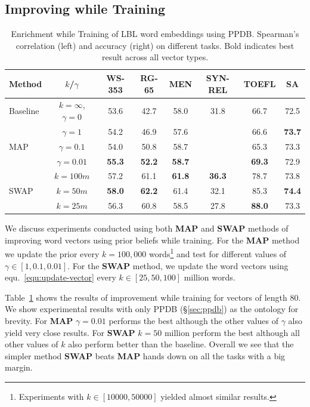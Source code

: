 \documentclass[11pt]{article}
\begin{document}
\subsection{Improving while Training}
\label{sec:improve-tr}

\begin{table}[!tbh]
  \centering
  \small
  \begin{tabular}{l|c||c|c|c||c|c||c}
Method & $k$/$\gamma$ & WS-353 & RG-65 & MEN & SYN-REL & TOEFL & SA \\
\hline
Baseline & $k=\infty$, $\gamma=0$ & 53.6 & 42.7 & 58.0 & 31.8 & 66.7 & 72.5 \\
\hline
\multirow{3}{*}{MAP} & $\gamma=1$ & 54.2 & 46.9 & 57.6 & & 66.6 & \textbf{73.7}\\
 & $\gamma=0.1$ & 54.0 & 50.8 & 58.7 & & 65.3 & 73.3\\
 & $\gamma=0.01$ & \textbf{55.3} & \textbf{52.2} & \textbf{58.7} & & \textbf{69.3} & 72.9\\
\hline\hline
\multirow{3}{*}{SWAP} & $k=100m$ & 57.2 & 61.1 & \textbf{61.8} & \textbf{36.3} & 78.7 & 73.8\\
 & $k=50m$ & \textbf{58.0} & \textbf{62.2} & 61.4 & 32.1 & 85.3 & \textbf{74.4} \\
 & $k=25m$ & 56.3 & 60.8 & 58.5 & 27.8 & \textbf{88.0} & 73.3\\
\end{tabular}
   \caption{Enrichment while Training of LBL word embeddings using PPDB.
   Spearman's correlation (left) and accuracy (right) on different tasks. Bold indicates 
   best result across all vector types.}
  \label{tab:lbl-tr}
\end{table}

We discuss experiments conducted using both \textbf{MAP} and \textbf{SWAP} methods of
improving word vectors using prior beliefs while training. For the \textbf{MAP} method
we update the prior every $k=100,000$ words\footnote{Experiments with $k \in [10000, 50000]$ 
yielded almost similar results.} and test for different values of $\gamma \in [1, 0.1, 0.01]$.
For the \textbf{SWAP} method, we update the word vectors using equ.~\ref{equ:update-vector}
every $k \in [25, 50, 100]$ million words. 

Table~\ref{tab:lbl-tr} shows the results of improvement while training for vectors of length $80$. 
We show experimental results 
with only PPDB (\S\ref{sec:ppdb}) as the ontology for brevity. For \textbf{MAP}
$\gamma = 0.01$ performs the best although the other values of $\gamma$ also yield very close 
results. For \textbf{SWAP} $k=50$ million perform the best although all other values of $k$
also perform better than the baseline. Overall we see that the simpler method \textbf{SWAP}
beats \textbf{MAP} hands down on all the tasks with a big margin.
\end{document}
